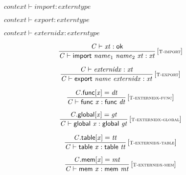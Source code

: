 \vspace{1ex}

$\boxed{{\mathit{context}} \vdash {\mathit{import}} : {\mathit{externtype}}}$

$\boxed{{\mathit{context}} \vdash {\mathit{export}} : {\mathit{externtype}}}$

$\boxed{{\mathit{context}} \vdash {\mathit{externidx}} : {\mathit{externtype}}}$

$$
\begin{array}{@{}c@{}}\displaystyle
\frac{
{\mathit{C}} \vdash {\mathit{xt}} : \mathsf{ok}
}{
{\mathit{C}} \vdash \mathsf{import}~{\mathit{name}}_{{1}}~{\mathit{name}}_{{2}}~{\mathit{xt}} : {\mathit{xt}}
} \, {[\textsc{\scriptsize T{-}import}]}
\qquad
\end{array}
$$

$$
\begin{array}{@{}c@{}}\displaystyle
\frac{
{\mathit{C}} \vdash {\mathit{externidx}} : {\mathit{xt}}
}{
{\mathit{C}} \vdash \mathsf{export}~{\mathit{name}}~{\mathit{externidx}} : {\mathit{xt}}
} \, {[\textsc{\scriptsize T{-}export}]}
\qquad
\end{array}
$$

\vspace{1ex}

$$
\begin{array}{@{}c@{}}\displaystyle
\frac{
{\mathit{C}}.\mathsf{func}{}[{\mathit{x}}] = {\mathit{dt}}
}{
{\mathit{C}} \vdash \mathsf{func}~{\mathit{x}} : \mathsf{func}~{\mathit{dt}}
} \, {[\textsc{\scriptsize T{-}externidx{-}func}]}
\qquad
\end{array}
$$

$$
\begin{array}{@{}c@{}}\displaystyle
\frac{
{\mathit{C}}.\mathsf{global}{}[{\mathit{x}}] = {\mathit{gt}}
}{
{\mathit{C}} \vdash \mathsf{global}~{\mathit{x}} : \mathsf{global}~{\mathit{gt}}
} \, {[\textsc{\scriptsize T{-}externidx{-}global}]}
\qquad
\end{array}
$$

$$
\begin{array}{@{}c@{}}\displaystyle
\frac{
{\mathit{C}}.\mathsf{table}{}[{\mathit{x}}] = {\mathit{tt}}
}{
{\mathit{C}} \vdash \mathsf{table}~{\mathit{x}} : \mathsf{table}~{\mathit{tt}}
} \, {[\textsc{\scriptsize T{-}externidx{-}table}]}
\qquad
\end{array}
$$

$$
\begin{array}{@{}c@{}}\displaystyle
\frac{
{\mathit{C}}.\mathsf{mem}{}[{\mathit{x}}] = {\mathit{mt}}
}{
{\mathit{C}} \vdash \mathsf{mem}~{\mathit{x}} : \mathsf{mem}~{\mathit{mt}}
} \, {[\textsc{\scriptsize T{-}externidx{-}mem}]}
\qquad
\end{array}
$$

